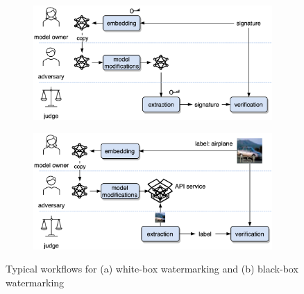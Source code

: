 \begin{figure}
     \centering
     \begin{subfigure}[b]{0.7\textwidth}
         \centering
         \includegraphics[width=\textwidth]{images/whitebox_workflow.png}
         \caption{}
         \label{fig:whitebox-workflow}
     \end{subfigure}
     \hfill
     \begin{subfigure}[b]{0.7\textwidth}
         \centering
         \includegraphics[width=\textwidth]{images/blackbox_workflow.png}
         \caption{}
         \label{fig:blackbox-workflow}
     \end{subfigure}
        \caption{Typical workflows for (a) white-box watermarking and (b) black-box watermarking}
        \label{fig:bothworkflows}
\end{figure}